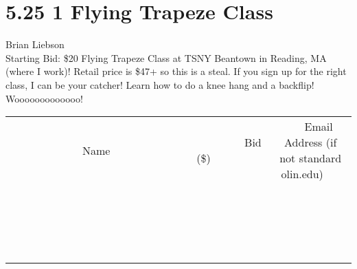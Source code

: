 \documentclass[11pt]{article}
\begin{document}
\section*{5.25 1 Flying Trapeze Class}
Brian Liebson
\\
Starting Bid: \$20
\newline
Flying Trapeze Class at TSNY Beantown in Reading, MA (where I work)! Retail price is \$47+ so this is a steal. If you sign up for the right class, I can be your catcher! Learn how to do a knee hang and a backflip! Wooooooooooooo!
\\[3ex]
\begin{tabular}{c c c}
~~~~~~~~~~~~~Name~~~~~~~~~~~~~ & ~~~~~~~~~Bid (\$)~~~~~~~~~  & ~~~Email Address (if not standard olin.edu)~~~\\
 & & \\
\hline
 & & \\
\hline
 & & \\
\hline
 & & \\
\hline
 & & \\
\hline
 & & \\
\hline
 & & \\
\hline
 & & \\
\hline
 & & \\
\hline
 & & \\
\hline
 & & \\
\hline
 & & \\
\hline
 & & \\
\hline
 & & \\
\hline
 & & \\
\hline
 & & \\
\hline
 & & \\
\hline
 & & \\
\hline
 & & \\
\hline
\end{tabular}
\newpage
\end{document}
